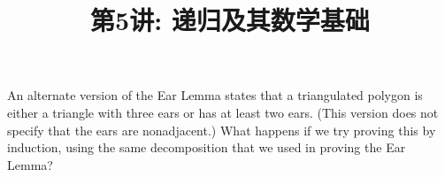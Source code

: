 \documentclass[a4paper, justified]{tufte-handout}
\title{第5讲: 递归及其数学基础}
\date{\zhtoday} %
\begin{document}
\maketitle
\noplagiarism %
\begin{abstract}
\end{abstract}
\beginrequired

\begin{problem}[CS 4.1-16]
An alternate version of the Ear Lemma states that a triangulated polygon is either a triangle with three ears or has at least two ears.
(This version does not specify that the ears are nonadjacent.) What happens if we try proving this by induction, using the same decomposition that we used in proving the Ear Lemma?
\end{problem}
\end{document}
